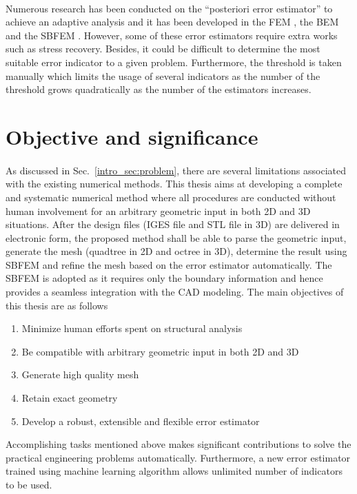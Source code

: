 \paragraph{}
Numerous research has been conducted on the ``posteriori error estimator'' to achieve an adaptive analysis and it has been developed in the FEM \citep{doi:10.1002/nme.1620330702,doi:10.1002/nme.1620330703, BOROOMAND1999127, ZIENKIEWICZ1999111, Ainsworth1993}, the BEM \citep{Zhao1998, Guiggiani1990, KAMIYA1992223} and the SBFEM \citep{NME:NME439}.
However, some of these error estimators require extra works such as stress recovery.
Besides, it could be difficult to determine the most suitable error indicator to a given problem.
Furthermore, the threshold is taken manually which limits the usage of several indicators as the number of the threshold grows quadratically as the number of the estimators increases.



\section{Objective and significance}
\paragraph{}
As discussed in Sec.~\ref{intro_sec:problem}, there are several limitations associated with the existing numerical methods.
This thesis aims at developing a complete and systematic numerical method where all procedures are conducted without human involvement for an arbitrary geometric input in both 2D and 3D situations.
After the design files (IGES file and STL file in 3D) are delivered in electronic form, the proposed method shall be able to parse the geometric input, generate the mesh (quadtree in 2D and octree in 3D), determine the result using SBFEM and refine the mesh based on the error estimator automatically.
The SBFEM is adopted as it requires only the boundary information and hence provides a seamless integration with the CAD modeling.
The main objectives of this thesis are as follows
\begin{enumerate}
    \item Minimize human efforts spent on structural analysis
    \item Be compatible with arbitrary geometric input in both 2D and 3D
    \item Generate high quality mesh
    \item Retain exact geometry
    \item Develop a robust, extensible and flexible error estimator
\end{enumerate}
Accomplishing tasks mentioned above makes significant contributions to solve the practical engineering problems automatically.
Furthermore, a new error estimator trained using machine learning algorithm allows unlimited number of indicators to be used.

